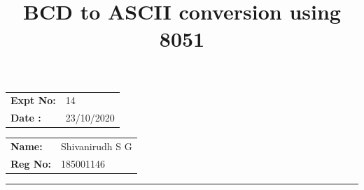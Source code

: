 \documentclass[12pt,a4paper]{article}
\title{\bf BCD to ASCII conversion using 8051}
\author{\vspace{-10ex}}
\date{\vspace{-10ex}}
\begin{document}
\maketitle

\begin{minipage}{0.45\textwidth}
        \begin{tabular}{l l}
            \textbf{Expt No:}&14\\
            \textbf{Date :}&23/10/2020
        \end{tabular}
\end{minipage}%
\begin{minipage}{0.45\textwidth}
        \begin{tabular}{l l}
             \textbf{Name:}& Shivanirudh S G  \\
             \textbf{Reg No:} & 185001146 
        \end{tabular}
\end{minipage}
\vspace{1cm}
\hrule
\end{document}

